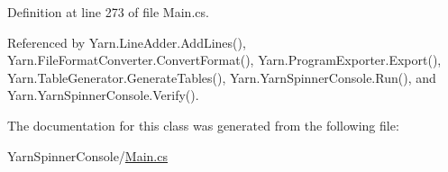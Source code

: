 Definition at line 273 of file Main.\-cs.



Referenced by Yarn.\-Line\-Adder.\-Add\-Lines(), Yarn.\-File\-Format\-Converter.\-Convert\-Format(), Yarn.\-Program\-Exporter.\-Export(), Yarn.\-Table\-Generator.\-Generate\-Tables(), Yarn.\-Yarn\-Spinner\-Console.\-Run(), and Yarn.\-Yarn\-Spinner\-Console.\-Verify().



The documentation for this class was generated from the following file\-:\begin{DoxyCompactItemize}
\item 
Yarn\-Spinner\-Console/\hyperlink{a00328}{Main.\-cs}\end{DoxyCompactItemize}
